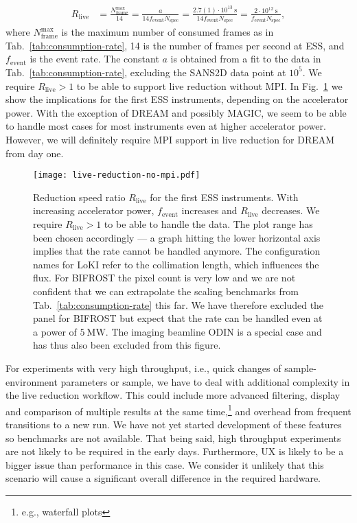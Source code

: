 \documentclass[a4paper,english,numbers=noenddot,bibliography=totoc,chapterprefix=on,DIV=12]{scrartcl}
\newcommand{\Nspec}{N_{\text{spec}}}
\newcommand{\Fevent}{f_{\text{event}}}
\newcommand{\bifrost}{BIFROST\xspace}
\newcommand{\dream}{DREAM\xspace}
\newcommand{\loki}{LoKI\xspace}
\newcommand{\magic}{MAGIC\xspace}
\newcommand{\odin}{ODIN\xspace}
\begin{document}
\begin{align}
  R_{\text{live}} &= \frac{N_{\text{frame}}^{\text{max}}}{14} = \frac{a}{14\Fevent\Nspec} = \frac{2.7(1)\cdot10^{13}~\mathrm{s}}{14\Fevent\Nspec} = \frac{2\cdot10^{12}~\mathrm{s}}{\Fevent\Nspec},
\end{align}
where $N_{\text{frame}}^{\text{max}}$ is the maximum number of consumed frames as in Tab.~\ref{tab:consumption-rate}, 14 is the number of frames per second at ESS, and $\Fevent$ is the event rate.
The constant $a$ is obtained from a fit to the data in Tab.~\ref{tab:consumption-rate}, excluding the SANS2D data point at $10^5$.
We require $R_{\text{live}} > 1$ to be able to support live reduction without MPI.
In Fig.~\ref{fig:live-reduction-no-mpi} we show the implications for the first ESS instruments, depending on the accelerator power.
With the exception of \dream and possibly \magic, we seem to be able to handle most cases for most instruments even at higher accelerator power.
However, we will definitely require MPI support in live reduction for \dream from day one.

\begin{figure}
  \centering
\texttt{[image: live-reduction-no-mpi.pdf]}
\caption{\label{fig:live-reduction-no-mpi}Reduction speed ratio $R_{\text{live}}$ for the first ESS instruments.
With increasing accelerator power, $\Fevent$ increases and $R_{\text{live}}$ decreases.
We require $R_{\text{live}} > 1$ to be able to handle the data.
The plot range has been chosen accordingly --- a graph hitting the lower horizontal axis implies that the rate cannot be handled anymore.
The configuration names for \loki refer to the collimation length, which influences the flux.
For \bifrost the pixel count is very low and we are not confident that we can extrapolate the scaling benchmarks from Tab.~\ref{tab:consumption-rate} this far.
We have therefore excluded the panel for \bifrost but expect that the rate can be handled even at a power of $5~\mathrm{MW}$.
The imaging beamline \odin is a special case and has thus also been excluded from this figure.
}
\end{figure}

For experiments with very high throughput, i.e., quick changes of sample-environment parameters or sample, we have to deal with additional complexity in the live reduction workflow.
This could include more advanced filtering, display and comparison of multiple results at the same time,\footnote{e.g., waterfall plots} and overhead from frequent transitions to a new run.
We have not yet started development of these features so benchmarks are not available.
That being said, high throughput experiments are not likely to be required in the early days.
Furthermore, UX is likely to be a bigger issue than performance in this case.
We consider it unlikely that this scenario will cause a significant overall difference in the required hardware.
\end{document}
